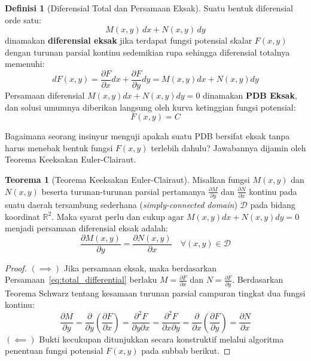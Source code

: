 \documentclass[11pt,a4paper]{article}
\theoremstyle{definition}
\newtheorem{definition}{Definisi}[section]
\newtheorem{theorem}{Teorema}[section]
\begin{document}
\begin{definition}[Diferensial Total dan Persamaan Eksak]
Suatu bentuk diferensial orde satu:
\begin{equation*}
    M(x,y)\,dx + N(x,y)\,dy
\end{equation*}
dinamakan \textbf{diferensial eksak} jika terdapat fungsi potensial skalar $F(x,y)$ dengan turunan parsial kontinu sedemikian rupa sehingga diferensial totalnya memenuhi:
\begin{equation}
    dF(x,y) = \frac{\partial F}{\partial x} dx + \frac{\partial F}{\partial y} dy = M(x,y) dx + N(x,y) dy
    \label{eq:total_differential}
\end{equation}
Persamaan diferensial $M(x,y)dx + N(x,y)dy = 0$ dinamakan \textbf{PDB Eksak}, dan solusi umumnya diberikan langsung oleh kurva ketinggian fungsi potensial:
\begin{equation}
    F(x,y) = C
    \label{eq:exact_sol}
\end{equation}
\end{definition}

Bagaimana seorang insinyur menguji apakah suatu PDB bersifat eksak tanpa harus menebak bentuk fungsi $F(x,y)$ terlebih dahulu? Jawabannya dijamin oleh Teorema Keeksakan Euler-Clairaut.

\begin{theorem}[Teorema Keeksakan Euler-Clairaut]
Misalkan fungsi $M(x,y)$ dan $N(x,y)$ beserta turunan-turunan parsial pertamanya $\frac{\partial M}{\partial y}$ dan $\frac{\partial N}{\partial x}$ kontinu pada suatu daerah tersambung sederhana (\textit{simply-connected domain}) $\mathcal{D}$ pada bidang koordinat $\mathbb{R}^2$. Maka syarat perlu dan cukup agar $M(x,y)dx + N(x,y)dy = 0$ menjadi persamaan diferensial eksak adalah:
\begin{equation}
    \frac{\partial M(x,y)}{\partial y} = \frac{\partial N(x,y)}{\partial x} \quad \forall (x,y) \in \mathcal{D}
    \label{eq:euler_clairaut}
\end{equation}
\end{theorem}

\begin{proof}
$(\implies)$ Jika persamaan eksak, maka berdasarkan Persamaan~\eqref{eq:total_differential} berlaku $M = \frac{\partial F}{\partial x}$ dan $N = \frac{\partial F}{\partial y}$. Berdasarkan Teorema Schwarz tentang kesamaan turunan parsial campuran tingkat dua fungsi kontinu:
\begin{equation}
    \frac{\partial M}{\partial y} = \frac{\partial}{\partial y}\left( \frac{\partial F}{\partial x} \right) = \frac{\partial^2 F}{\partial y \partial x} = \frac{\partial^2 F}{\partial x \partial y} = \frac{\partial}{\partial x}\left( \frac{\partial F}{\partial y} \right) = \frac{\partial N}{\partial x}
\end{equation}
$(\impliedby)$ Bukti kecukupan ditunjukkan secara konstruktif melalui algoritma penentuan fungsi potensial $F(x,y)$ pada subbab berikut.
\end{proof}
\end{document}
